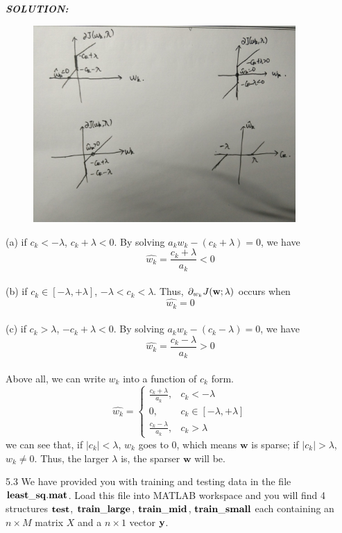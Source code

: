 \documentclass{article}
\theoremstyle{definition}
\theoremstyle{definition}
\theoremstyle{remark}
\begin{document}
\emph{\textbf{SOLUTION:}}\\
\begin{figure}
\centering
\includegraphics[width=10cm]{wk.eps}
\label{fig:fig}
\end{figure}
\qquad\qquad (a) if $c_{k}<-\lambda$, $c_k+\lambda<0$. By solving $a_{k}w_{k}-(c_{k}+\lambda)=0$, we have
\[\hat{w_k} =\frac{c_{k}+\lambda}{a_k}<0\]\\
\qquad\qquad (b) if $c_{k}\in [-\lambda, +\lambda]$, $-\lambda<c_k<\lambda $. Thus, $\partial_{w_{k}}J(\bold{w};\lambda)$ occurs when
 \[\hat{w_k} =0\]\\
\qquad\qquad (c) if $c_{k}>\lambda$, $-c_k+\lambda<0$. By solving $a_{k}w_{k}-(c_{k}-\lambda)=0$, we have
\[\hat{w_k} =\frac{c_{k}-\lambda}{a_k}>0\]\\
Above all, we can write $w_{k}$ into a function of $c_k$ form.
\begin{displaymath}
\hat{w_k} =\left\{ \begin{array}{ll}
\frac{c_{k}+\lambda}{a_k}, & c_{k}<-\lambda\\
0, & c_{k}\in [-\lambda, +\lambda] \\
\frac{c_{k}-\lambda}{a_k}, & c_{k}>\lambda
\end{array} \right.
\end{displaymath}
we can see that, if $|c_k| < \lambda$,  $w_k$ goes to 0, which means $\mathbf{w}$ is sparse; if $|c_k| > \lambda$, $w_k\neq 0$. Thus, the larger $\lambda$ is, the sparser $\mathbf{w}$ will be.

5.3 We have provided you with training and testing data in the file $\bold{least\_sq.mat}$. Load this file into MATLAB workspace and you will find 4 structures $\bold{test}$, $\bold{train\_large}$, $\bold{train\_mid}$, $\bold{train\_small}$ each containing an $n\times M$ matrix $X$ and a $n\times 1$ vector $\bold{y}$.
\end{document}
